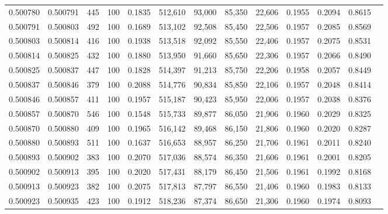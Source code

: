 \begin{tabular}{rrrrrrrrrrrrr}
0.500780 & 0.500791 &   445 & 100 &                                     0.1835 & 512,610 &  93,000 &  85,350 &  22,606 & 0.1955 & 0.2094 & 0.8615 \\
0.500791 & 0.500803 &   492 & 100 &                                     0.1689 & 513,102 &  92,508 &  85,450 &  22,506 & 0.1957 & 0.2085 & 0.8569 \\
0.500803 & 0.500814 &   416 & 100 &                                     0.1938 & 513,518 &  92,092 &  85,550 &  22,406 & 0.1957 & 0.2075 & 0.8531 \\
0.500814 & 0.500825 &   432 & 100 &                                     0.1880 & 513,950 &  91,660 &  85,650 &  22,306 & 0.1957 & 0.2066 & 0.8490 \\
0.500825 & 0.500837 &   447 & 100 &                                     0.1828 & 514,397 &  91,213 &  85,750 &  22,206 & 0.1958 & 0.2057 & 0.8449 \\
0.500837 & 0.500846 &   379 & 100 &                                     0.2088 & 514,776 &  90,834 &  85,850 &  22,106 & 0.1957 & 0.2048 & 0.8414 \\
0.500846 & 0.500857 &   411 & 100 &                                     0.1957 & 515,187 &  90,423 &  85,950 &  22,006 & 0.1957 & 0.2038 & 0.8376 \\
0.500857 & 0.500870 &   546 & 100 &                                     0.1548 & 515,733 &  89,877 &  86,050 &  21,906 & 0.1960 & 0.2029 & 0.8325 \\
0.500870 & 0.500880 &   409 & 100 &                                     0.1965 & 516,142 &  89,468 &  86,150 &  21,806 & 0.1960 & 0.2020 & 0.8287 \\
0.500880 & 0.500893 &   511 & 100 &                                     0.1637 & 516,653 &  88,957 &  86,250 &  21,706 & 0.1961 & 0.2011 & 0.8240 \\
0.500893 & 0.500902 &   383 & 100 &                                     0.2070 & 517,036 &  88,574 &  86,350 &  21,606 & 0.1961 & 0.2001 & 0.8205 \\
0.500902 & 0.500913 &   395 & 100 &                                     0.2020 & 517,431 &  88,179 &  86,450 &  21,506 & 0.1961 & 0.1992 & 0.8168 \\
0.500913 & 0.500923 &   382 & 100 &                                     0.2075 & 517,813 &  87,797 &  86,550 &  21,406 & 0.1960 & 0.1983 & 0.8133 \\
0.500923 & 0.500935 &   423 & 100 &                                     0.1912 & 518,236 &  87,374 &  86,650 &  21,306 & 0.1960 & 0.1974 & 0.8093 \\

\end{tabular}
